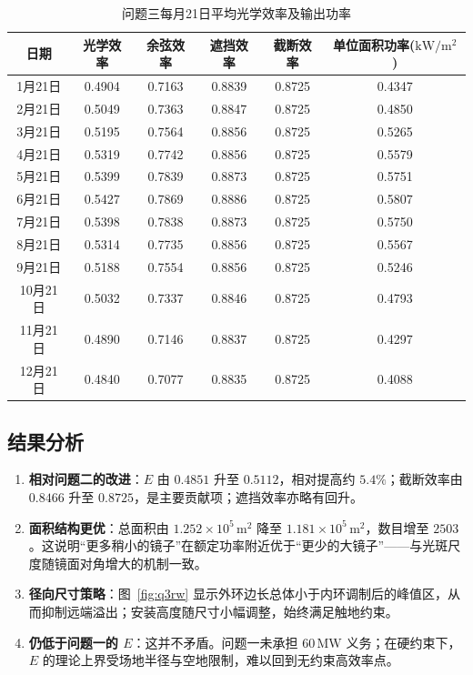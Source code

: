 \documentclass[withoutpreface,bwprint]{cumcmthesis}
\begin{document}
\begin{table}[htbp]
\centering
\caption{问题三每月21日平均光学效率及输出功率}\label{tab:q3m}
\scriptsize
\begin{tabular}{cccccc}
\toprule
日期 & 光学效率 & 余弦效率 & 遮挡效率 & 截断效率 & 单位面积功率($\mathrm{kW/m^2}$) \\
\midrule
1月21日 & 0.4904 & 0.7163 & 0.8839 & 0.8725 & 0.4347 \\
2月21日 & 0.5049 & 0.7363 & 0.8847 & 0.8725 & 0.4850 \\
3月21日 & 0.5195 & 0.7564 & 0.8856 & 0.8725 & 0.5265 \\
4月21日 & 0.5319 & 0.7742 & 0.8856 & 0.8725 & 0.5579 \\
5月21日 & 0.5399 & 0.7839 & 0.8873 & 0.8725 & 0.5751 \\
6月21日 & 0.5427 & 0.7869 & 0.8886 & 0.8725 & 0.5807 \\
7月21日 & 0.5398 & 0.7838 & 0.8873 & 0.8725 & 0.5750 \\
8月21日 & 0.5314 & 0.7735 & 0.8856 & 0.8725 & 0.5567 \\
9月21日 & 0.5188 & 0.7554 & 0.8856 & 0.8725 & 0.5246 \\
10月21日 & 0.5032 & 0.7337 & 0.8846 & 0.8725 & 0.4793 \\
11月21日 & 0.4890 & 0.7146 & 0.8837 & 0.8725 & 0.4297 \\
12月21日 & 0.4840 & 0.7077 & 0.8835 & 0.8725 & 0.4088 \\
\bottomrule
\end{tabular}
\end{table}

\subsection{结果分析}
\begin{enumerate}[leftmargin=2em]
  \item \textbf{相对问题二的改进}：$E$ 由 $0.4851$ 升至 $0.5112$，相对提高约 $5.4\%$；截断效率由 $0.8466$ 升至 $0.8725$，是主要贡献项；遮挡效率亦略有回升。
  \item \textbf{面积结构更优}：总面积由 $1.252\times10^5\,\mathrm{m^2}$ 降至 $1.181\times10^5\,\mathrm{m^2}$，数目增至 $2503$。这说明“更多稍小的镜子”在额定功率附近优于“更少的大镜子”——与光斑尺度随镜面对角增大的机制一致。
  \item \textbf{径向尺寸策略}：图~\ref{fig:q3rw} 显示外环边长总体小于内环调制后的峰值区，从而抑制远端溢出；安装高度随尺寸小幅调整，始终满足触地约束。
  \item \textbf{仍低于问题一的 $E$}：这并不矛盾。问题一未承担 $60\,\mathrm{MW}$ 义务；在硬约束下，$E$ 的理论上界受场地半径与空地限制，难以回到无约束高效率点。
\end{enumerate}
\end{document}
